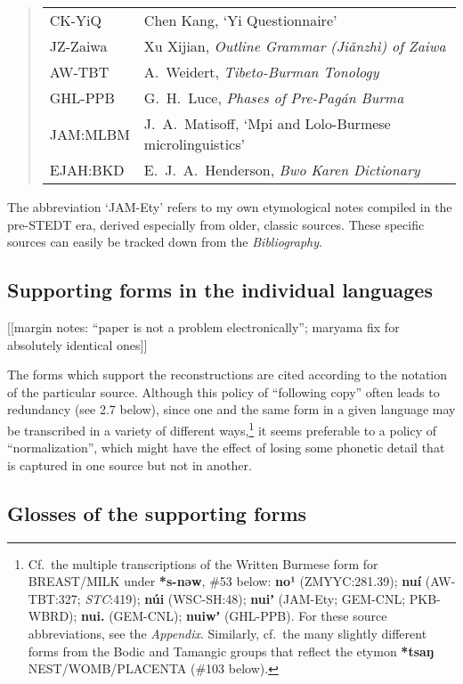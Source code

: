 \begin{quote}
\begin{tabular}{ll}
CK-YiQ	&Chen Kang, ‘Yi Questionnaire’\\
JZ-Zaiwa	&Xu Xijian, \textit{Outline Grammar (Jiǎnzhì) of Zaiwa}\\
AW-TBT	&A.~Weidert, \textit{Tibeto-Burman Tonology}\\
GHL-PPB	&G.~H.~Luce, \textit{Phases of Pre-Pag\'an Burma}\\
JAM:MLBM	&J.~A.~Matisoff, ‘Mpi and Lolo-Burmese microlinguistics’\\
EJAH:BKD	&E.~J.~A.~Henderson, \textit{Bwo Karen Dictionary}\\
\end{tabular}
\end{quote}

The abbreviation ‘JAM-Ety’ refers to my own etymological notes compiled in the
pre-STEDT era, derived especially from older, classic sources.  These specific
sources can easily be tracked down from the \textit{Bibliography}.

\subsection{Supporting forms in the individual languages}

[[margin notes: “paper is not a problem electronically”; maryama fix for absolutely identical ones]]

The forms which support the reconstructions are cited according to the
notation of the particular source.  Although this policy of “following copy”
often leads to redundancy (see 2.7 below), since one and the same form in a
given language may be transcribed in a variety of different ways,\footnote{Cf.\ the
multiple transcriptions of the Written Burmese form for BREAST/MILK under
\textbf{*s-nəw}, \#53 below:  \textbf{no¹}
(ZMYYC:281.39); \textbf{nuí} (AW-TBT:327; \textit{STC}:419); \textbf{núi}
(WSC-SH:48); \textbf{nuiʼ} (JAM-Ety; GEM-CNL; PKB-WBRD);
\textbf{nui.} (GEM-CNL); \textbf{nuiwʼ} (GHL-PPB).
 For these source abbreviations, see the \textit{Appendix}. Similarly, cf.\ the many slightly different forms from the Bodic and Tamangic groups that reflect the etymon \textbf{*tsaŋ} NEST/WOMB/PLACENTA (\#103 below).} it seems preferable to a
policy of “normalization”, which might have the effect of losing some phonetic
detail that is captured in one source but not in another.

\subsection{Glosses of the supporting forms}


